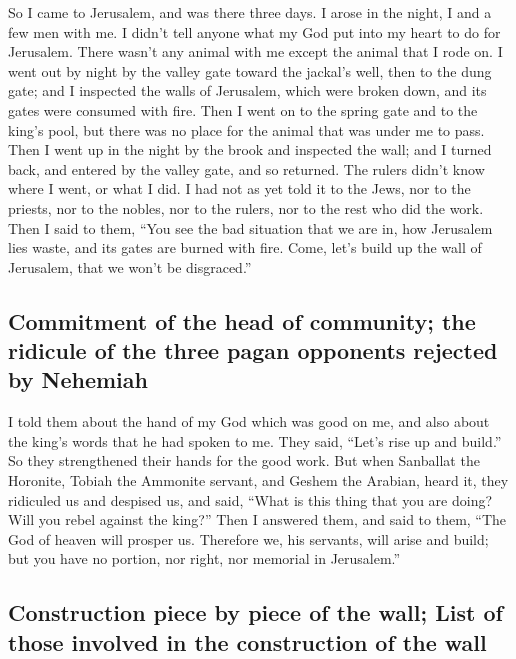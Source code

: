  So I came to Jerusalem, and was there three days.
 I arose in the night, I and a few men with me. I didn't
tell anyone what my God put into my heart to do for Jerusalem. There
wasn't any animal with me except the animal that I rode on.
 I went out by night by the valley gate toward the
jackal's well, then to the dung gate; and I inspected the walls of
Jerusalem, which were broken down, and its gates were consumed with
fire.  Then I went on to the spring gate and to the
king's pool, but there was no place for the animal that was under me to
pass.  Then I went up in the night by the brook and
inspected the wall; and I turned back, and entered by the valley gate,
and so returned.  The rulers didn't know where I went, or
what I did. I had not as yet told it to the Jews, nor to the priests,
nor to the nobles, nor to the rulers, nor to the rest who did the work.
 Then I said to them, ``You see the bad situation that we
are in, how Jerusalem lies waste, and its gates are burned with fire.
Come, let's build up the wall of Jerusalem, that we won't be
disgraced.''

\hypertarget{commitment-of-the-head-of-community-the-ridicule-of-the-three-pagan-opponents-rejected-by-nehemiah}{%
\subsection{Commitment of the head of community; the ridicule of the
three pagan opponents rejected by
Nehemiah}\label{commitment-of-the-head-of-community-the-ridicule-of-the-three-pagan-opponents-rejected-by-nehemiah}}

 I told them about the hand of my God which was good on
me, and also about the king's words that he had spoken to me. They said,
``Let's rise up and build.'' So they strengthened their hands for the
good work.  But when Sanballat the Horonite, Tobiah the
Ammonite servant, and Geshem the Arabian, heard it, they ridiculed us
and despised us, and said, ``What is this thing that you are doing? Will
you rebel against the king?''  Then I answered them, and
said to them, ``The God of heaven will prosper us. Therefore we, his
servants, will arise and build; but you have no portion, nor right, nor
memorial in Jerusalem.''

\hypertarget{construction-piece-by-piece-of-the-wall-list-of-those-involved-in-the-construction-of-the-wall}{%
\subsection{Construction piece by piece of the wall; List of those
involved in the construction of the
wall}\label{construction-piece-by-piece-of-the-wall-list-of-those-involved-in-the-construction-of-the-wall}}


